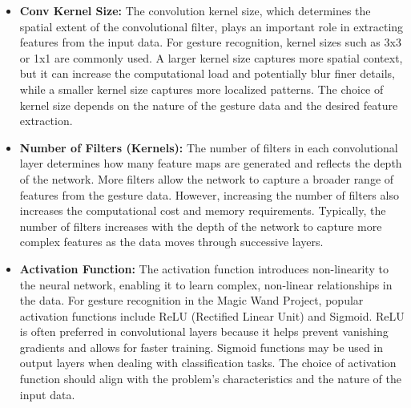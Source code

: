 \begin{itemize}
	\item \textbf{Conv Kernel Size:} The convolution kernel size, which determines the spatial extent of the convolutional filter, plays an important role in extracting features from the input data. For gesture recognition, kernel sizes such as 3x3 or 1x1 are commonly used. A larger kernel size captures more spatial context, but it can increase the computational load and potentially blur finer details, while a smaller kernel size captures more localized patterns. The choice of kernel size depends on the nature of the gesture data and the desired feature extraction.
	
	\item \textbf{Number of Filters (Kernels):} The number of filters in each convolutional layer determines how many feature maps are generated and reflects the depth of the network. More filters allow the network to capture a broader range of features from the gesture data. However, increasing the number of filters also increases the computational cost and memory requirements. Typically, the number of filters increases with the depth of the network to capture more complex features as the data moves through successive layers.
	
	\item \textbf{Activation Function:} The activation function introduces non-linearity to the neural network, enabling it to learn complex, non-linear relationships in the data. For gesture recognition in the Magic Wand Project, popular activation functions include ReLU (Rectified Linear Unit) and Sigmoid. ReLU is often preferred in convolutional layers because it helps prevent vanishing gradients and allows for faster training. Sigmoid functions may be used in output layers when dealing with classification tasks. The choice of activation function should align with the problem's characteristics and the nature of the input data.
\end{itemize}

